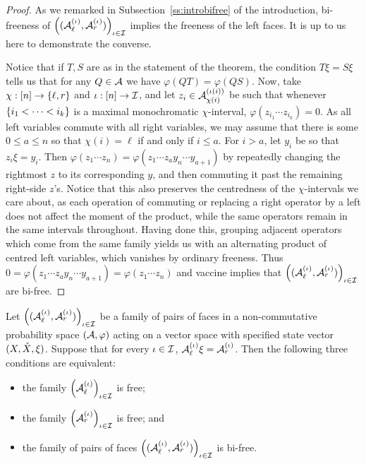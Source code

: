\begin{proof}
	As we remarked in Subsection~\ref{ss:introbifree} of the introduction, bi-freeness of $\left((\mathcal{A}_\ell^{(\iota)}, \mathcal{A}_r^{(\iota)})\right)_{\iota\in\mathcal{I}}$ implies the freeness of the left faces.
	It is up to us here to demonstrate the converse.

	Notice that if $T, S$ are as in the statement of the theorem, the condition $T\xi = S\xi$ tells us that for any $Q \in \mathcal{A}$ we have $\varphi(QT) = \varphi(QS)$.
	Now, take $\chi : [n] \to \left\{\ell, r\right\}$ and $\iota : [n] \to \mathcal{I}$, and let $z_i \in \mathcal{A}_{\chi(i)}^{(\iota(i))}$ be such that whenever $\left\{i_1 < \cdots < i_k\right\}$ is a maximal monochromatic $\chi$-interval, $\varphi(z_{i_1}\cdots z_{i_k}) = 0$.
	As all left variables commute with all right variables, we may assume that there is some $0 \leq a \leq n$ so that $\chi(i) = \ell$ if and only if $i \leq a$.
	For $i > a$, let $y_i$ be so that $z_i\xi = y_i$.
	Then $\varphi(z_{1}\cdots z_{n}) = \varphi(z_1\cdots z_a y_n \cdots y_{a+1})$ by repeatedly changing the rightmost $z$ to its corresponding $y$, and then commuting it past the remaining right-side $z$'s.
	Notice that this also preserves the centredness of the $\chi$-intervals we care about, as each operation of commuting or replacing a right operator by a left does not affect the moment of the product, while the same operators remain in the same intervals throughout.
	Having done this, grouping adjacent operators which come from the same family yields us with an alternating product of centred left variables, which vanishes by ordinary freeness.
	Thus $0 = \varphi(z_1\cdots z_a y_n \cdots y_{a+1}) = \varphi(z_1\cdots z_n)$ and vaccine implies that $\left((\mathcal{A}_\ell^{(\iota)}, \mathcal{A}_r^{(\iota)})\right)_{\iota\in\mathcal{I}}$ are bi-free.
\end{proof}

\begin{corollary}
	Let $\left((\mathcal{A}_\ell^{(\iota)}, \mathcal{A}_r^{(\iota)})\right)_{\iota\in\mathcal{I}}$ be a family of pairs of faces in a non-commutative probability space $(\mathcal{A}, \varphi)$ acting on a vector space with specified state vector $(X, \mathring{X}, \xi)$.
	Suppose that for every $\iota\in\mathcal{I}$, $\mathcal{A}^{(\iota)}_\ell \xi = \mathcal{A}^{(\iota)}_r$.
	Then the following three conditions are equivalent:
	\begin{itemize}
		\item the family $\left(\mathcal{A}_\ell^{(\iota)}\right)_{\iota\in\mathcal{I}}$ is free;
		\item the family $\left(\mathcal{A}_r^{(\iota)}\right)_{\iota\in\mathcal{I}}$ is free; and
		\item the family of pairs of faces $\left((\mathcal{A}_\ell^{(\iota)}, \mathcal{A}_r^{(\iota)})\right)_{\iota\in\mathcal{I}}$ is bi-free.
	\end{itemize}
\end{corollary}

